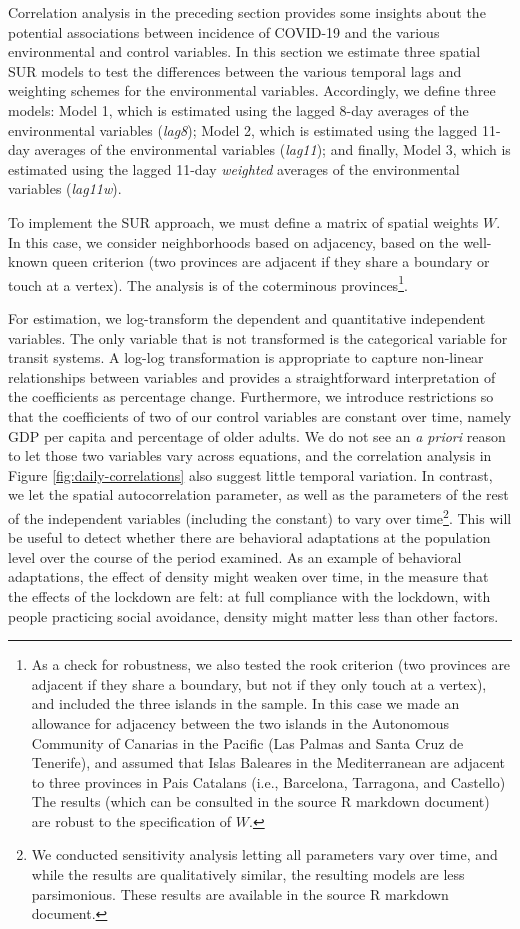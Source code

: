 \documentclass[]{elsarticle} %
\begin{document}
Correlation analysis in the preceding section provides some insights
about the potential associations between incidence of COVID-19 and the
various environmental and control variables. In this section we estimate
three spatial SUR models to test the differences between the various
temporal lags and weighting schemes for the environmental variables.
Accordingly, we define three models: Model 1, which is estimated using
the lagged 8-day averages of the environmental variables (\emph{lag8});
Model 2, which is estimated using the lagged 11-day averages of the
environmental variables (\emph{lag11}); and finally, Model 3, which is
estimated using the lagged 11-day \emph{weighted} averages of the
environmental variables (\emph{lag11w}).

To implement the SUR approach, we must define a matrix of spatial
weights \(W\). In this case, we consider neighborhoods based on
adjacency, based on the well-known queen criterion (two provinces are
adjacent if they share a boundary or touch at a vertex). The analysis is
of the coterminous
provinces\footnote{As a check for robustness, we also tested the rook criterion (two provinces are adjacent if they share a boundary, but not if they only touch at a vertex), and included the three islands in the sample. In this case we made an allowance for adjacency between the two islands in the Autonomous Community of Canarias in the Pacific (Las Palmas and Santa Cruz de Tenerife), and assumed that Islas Baleares in the Mediterranean are adjacent to three provinces in Pais Catalans (i.e., Barcelona, Tarragona, and Castello) The results (which can be consulted in the source R markdown document) are robust to the specification of $W$.}.

For estimation, we log-transform the dependent and quantitative
independent variables. The only variable that is not transformed is the
categorical variable for transit systems. A log-log transformation is
appropriate to capture non-linear relationships between variables and
provides a straightforward interpretation of the coefficients as
percentage change. Furthermore, we introduce restrictions so that the
coefficients of two of our control variables are constant over time,
namely GDP per capita and percentage of older adults. We do not see an
\emph{a priori} reason to let those two variables vary across equations,
and the correlation analysis in Figure \ref{fig:daily-correlations} also
suggest little temporal variation. In contrast, we let the spatial
autocorrelation parameter, as well as the parameters of the rest of the
independent variables (including the constant) to vary over
time\footnote{We conducted sensitivity analysis letting all parameters vary over time, and while the results are qualitatively similar, the resulting models are less parsimonious. These results are available in the source R markdown document.}.
This will be useful to detect whether there are behavioral adaptations
at the population level over the course of the period examined. As an
example of behavioral adaptations, the effect of density might weaken
over time, in the measure that the effects of the lockdown are felt: at
full compliance with the lockdown, with people practicing social
avoidance, density might matter less than other factors.
\end{document}
